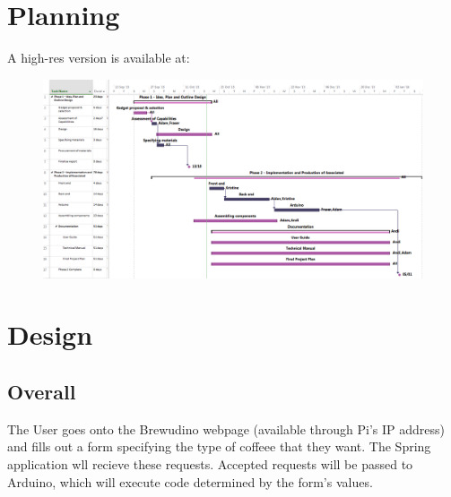 \documentclass[12pt, a4paper]{article}
\begin{document}

\section{Planning}
A high-res version is available at:
\begin{figure}[H]
    \centering    
    \includegraphics[angle=90, scale=0.5]{images/ProjectPlan}
\end{figure}

\newpage


\section{Design}


\subsection{Overall}
The User goes onto the Brewudino webpage (available through Pi's IP address) and 
fills out a form specifying the type of coffeee that they want. The Spring application wll recieve these requests. Accepted requests will be passed to
Arduino, which will execute code determined by the form's values.
\end{document}
